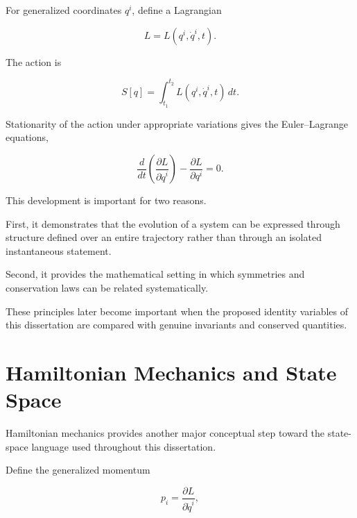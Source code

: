 \documentclass[12pt,oneside]{book}
\begin{document}
For generalized coordinates \(q^i\), define a Lagrangian

\begin{equation}
    L
    =
    L(q^i,\dot{q}^i,t).
    \label{eq:lagrangian-definition}
\end{equation}

The action is

\begin{equation}
    S[q]
    =
    \int_{t_1}^{t_2}
        L(q^i,\dot{q}^i,t)
    \,dt.
    \label{eq:action-definition}
\end{equation}

Stationarity of the action under appropriate variations gives
the Euler--Lagrange equations,

\begin{equation}
    \frac{d}{dt}
    \left(
        \frac{\partial L}
        {\partial \dot{q}^i}
    \right)
    -
    \frac{\partial L}
    {\partial q^i}
    =
    0.
    \label{eq:euler-lagrange}
\end{equation}

This development is important for two reasons.

First, it demonstrates that the evolution of a system can be
expressed through structure defined over an entire trajectory
rather than through an isolated instantaneous statement.

Second, it provides the mathematical setting in which
symmetries and conservation laws can be related systematically.

These principles later become important when the proposed
identity variables of this dissertation are compared with
genuine invariants and conserved quantities.


\section{Hamiltonian Mechanics and State Space}
\label{sec:hamiltonian-state-space}

Hamiltonian mechanics provides another major conceptual step
toward the state-space language used throughout this
dissertation.

Define the generalized momentum

\begin{equation}
    p_i
    =
    \frac{\partial L}
    {\partial \dot{q}^i},
    \label{eq:generalized-momentum}
\end{equation}
\end{document}
